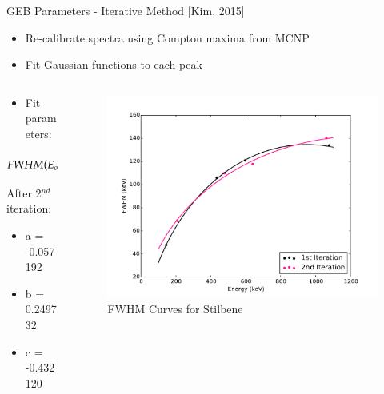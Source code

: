 \documentclass{beamer}
\begin{document}
\begin{frame}{GEB Parameters - Iterative Method [Kim, 2015]}
  \begin{itemize}
  \item Re-calibrate spectra using Compton maxima from MCNP
  \item Fit Gaussian functions to each peak
  \end{itemize}
\vspace*{-0.5cm}
  \begin{columns}
    \begin{column}{0.4\textwidth}
    \vspace*{-0.2cm}
	\begin{itemize}
    \item Fit parameters:
    \end{itemize}
    \vspace*{0.3cm}
 	\[\small{FWHM(E_o) = a + b \sqrt{E_o + c E_o^2}}\]
      \begin{block}{After 2$^{nd}$ iteration:}
  	  \begin{itemize}
      \item a = -0.057192
      \item b =  0.249732
      \item c = -0.432120
      \end{itemize}
	\end{block} 
	\end{column}
	\begin{column}{0.5\textwidth}
      \begin{figure}
      \begin{center}
      \vspace{-0.5cm}
      \includegraphics[scale=0.3]{FWHM_values2}
      \vspace{-0.5cm}
      \caption{\scriptsize{FWHM Curves for Stilbene}}
      \end{center}
      \end{figure}
	\end{column}
  \end{columns}
\end{frame}
\end{document}
